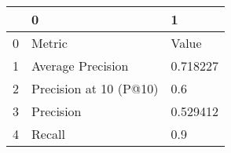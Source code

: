 \begin{tabular}{lll}
\toprule
{} &                       0 &         1 \\
\midrule
0 &                  Metric &     Value \\
1 &       Average Precision &  0.718227 \\
2 &  Precision at 10 (P@10) &       0.6 \\
3 &               Precision &  0.529412 \\
4 &                  Recall &       0.9 \\
\bottomrule
\end{tabular}
